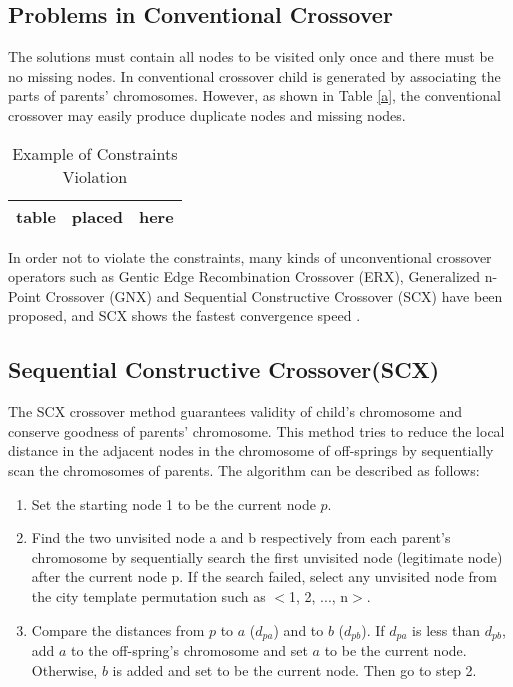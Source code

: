 \subsection{Problems in Conventional Crossover}

The solutions must contain all nodes to be visited only once and there must be no missing nodes. In conventional crossover child is generated by associating the parts of parents' chromosomes. However, as shown in Table \ref{a}, the conventional crossover may easily produce duplicate nodes and missing nodes.


\begin{table}
\caption{Example of Constraints Violation}
\label{tab:constraintsViolation}
\begin{center}
\begin{tabular}{|c|c|c|}\hline
table & placed & here\\ \hline
\end{tabular}
\end{center}
\end{table}

In order not to violate the constraints, many kinds of unconventional crossover operators such as Gentic Edge Recombination Crossover (ERX), Generalized n- Point Crossover (GNX) and Sequential Constructive Crossover (SCX) have been proposed, and SCX shows the fastest convergence speed \cite{a}.

\subsection{Sequential Constructive Crossover(SCX)}

The SCX crossover method guarantees validity of child's chromosome and conserve goodness of parents' chromosome. This method tries to reduce the local distance in the adjacent nodes in the chromosome of off-springs by sequentially scan the chromosomes of parents. The algorithm can be described as follows\cite{a}:

\begin{enumerate}
\item{Set the starting node 1 to be the current node $p$.}
\item{Find the two unvisited node a and b respectively from each parent's chromosome by sequentially search the first unvisited node (legitimate node) after the current node p. If the search failed, select any unvisited node from the city template permutation such as $<$1, 2, ..., n$>$.}
\item{Compare the distances from $p$ to $a$ ($d_{pa}$) and to $b$ ($d_{pb}$). If $d_{pa}$ is less than $d_{pb}$, add $a$ to the off-spring's chromosome and set $a$ to be the current node. Otherwise, $b$ is added and set to be the current node. Then go to step 2.}
\end{enumerate}

